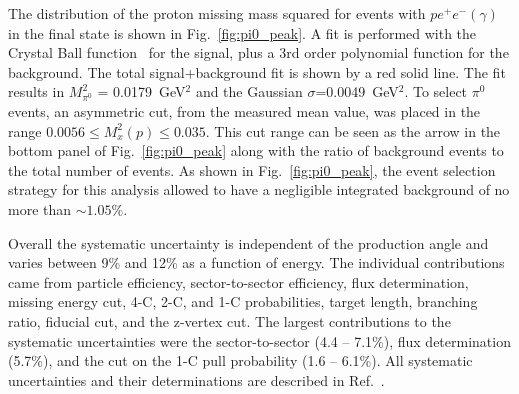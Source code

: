 \documentclass[aps,prc,twocolumn,floatfix,showpacs,preprintnumbers,amsmath,amssymb,superscriptaddress,linenumbers]{revtex4-1}
\def\pizT{$\pi^{0} \ $}
\begin{document}
The distribution of the proton missing mass squared for events with 
$pe^+e^-(\gamma)$ in the final state is shown in Fig.~\ref{fig:pi0_peak}. 
A fit is performed with the Crystal Ball function~\cite{Oreglia:1980cs,
Skwarnicki:1986xj} for the signal, plus a 3rd order polynomial function 
for the background. The total signal+background fit is shown by a red solid 
line. The fit results in $M_{\pi^0}^2$ = 0.0179~GeV$^2$ and the Gaussian 
$\sigma$=0.0049~GeV$^2$. To select \pizT events, an asymmetric cut, from 
the measured mean value, was placed in the range $0.0056 \le  M_x^2(p) 
\le 0.035$. This cut range can be seen as the arrow in the bottom 
panel of Fig.~\ref{fig:pi0_peak} along with the ratio of background 
events to the total number of events. As shown in Fig.~\ref{fig:pi0_peak}, 
the event selection strategy for this analysis allowed to have a 
negligible integrated background of no more than $\sim1.05\%$.

Overall the systematic uncertainty is independent of the production angle 
and varies between 9\% and 12\% as a function of energy. The individual 
contributions came from particle efficiency, sector-to-sector efficiency, 
flux determination, missing energy cut, 4-C, 2-C, and 1-C probabilities, 
target length, branching ratio, fiducial cut, and the z-vertex cut.
The largest contributions to the systematic uncertainties 
were the sector-to-sector (4.4 -- 7.1\%), flux determination (5.7\%),
and the cut on the 1-C pull probability (1.6 -- 6.1\%). All systematic 
uncertainties and their determinations are described in Ref.~\cite{Kunkel}.

\end{document}
